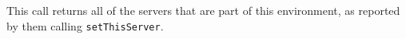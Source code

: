 This call returns all of the servers that are part of this \Rapture environment, as reported by them
calling \verb+setThisServer+.
